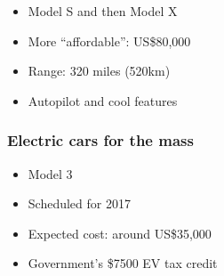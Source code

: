 \begin{frame}
\begin{itemize}
    \itemsep1.5em
    \item Model S and then Model X
    \item More ``affordable'': US\$80,000
    \item Range: 320 miles (520km)
    \item Autopilot and cool features
\end{itemize}
\end{frame}

\begin{frame}
\frametitle{Electric cars for the mass}
\begin{itemize}
    \itemsep1.5em
    \item Model 3
    \item Scheduled for 2017
    \item Expected cost: around US\$35,000
    \item Government's \$7500 EV tax credit
\end{itemize}
\end{frame}
